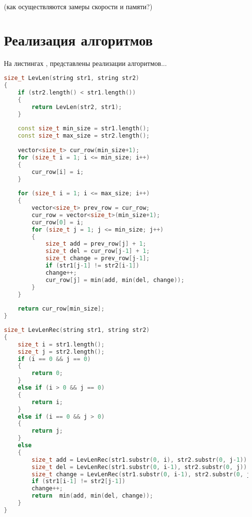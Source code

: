 (как осуществляются замеры скорости и памяти?)
\section{Реализация алгоритмов}
На листингах , представлены реализации алгоритмов...

\begin{lstlisting}[language=c++, caption=Реализация алгоритма Левенштейна обычным способом]
size_t LevLen(string str1, string str2)
{
	if (str2.length() < str1.length())
	{
		return LevLen(str2, str1);
	}
	
	const size_t min_size = str1.length();
	const size_t max_size = str2.length();
	
	vector<size_t> cur_row(min_size+1);
	for (size_t i = 1; i <= min_size; i++)
	{
		cur_row[i] = i;
	}
	
	for (size_t i = 1; i <= max_size; i++)
	{
		vector<size_t> prev_row = cur_row;
		cur_row = vector<size_t>(min_size+1);
		cur_row[0] = i;
		for (size_t j = 1; j <= min_size; j++)
		{
			size_t add = prev_row[j] + 1;
			size_t del = cur_row[j-1] + 1;
			size_t change = prev_row[j-1];
			if (str1[j-1] != str2[i-1])
			change++;
			cur_row[j] = min(add, min(del, change));
		}
	}
	
	return cur_row[min_size];
}
\end{lstlisting}


\begin{lstlisting}[language=c++, caption=Реализация алгоритма Левенштейна рекусрсивным способом]
size_t LevLenRec(string str1, string str2)
{
	size_t i = str1.length();
	size_t j = str2.length();
	if (i == 0 && j == 0)
	{
		return 0;
	}
	else if (i > 0 && j == 0)
	{
		return i;
	}
	else if (i == 0 && j > 0)
	{
		return j;
	}
	else
	{
		size_t add = LevLenRec(str1.substr(0, i), str2.substr(0, j-1)) + 1;
		size_t del = LevLenRec(str1.substr(0, i-1), str2.substr(0, j)) + 1;
		size_t change = LevLenRec(str1.substr(0, i-1), str2.substr(0, j-1));
		if (str1[i-1] != str2[j-1])
		change++;
		return  min(add, min(del, change));
	}
}
\end{lstlisting}

